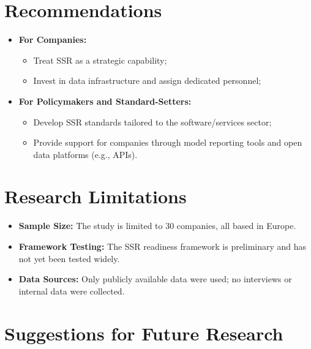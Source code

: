 \section{Recommendations}

\begin{itemize}
    \item \textbf{For Companies:}
    \begin{itemize}
        \item Treat SSR as a strategic capability;
        \item Invest in data infrastructure and assign dedicated personnel;
    \end{itemize}

    \item \textbf{For Policymakers and Standard-Setters:}
    \begin{itemize}
        \item Develop SSR standards tailored to the software/services sector;
        \item Provide support for companies through model reporting tools and open data platforms (e.g., APIs).
    \end{itemize}
\end{itemize}

\section{Research Limitations}

\begin{itemize}
    \item \textbf{Sample Size:}  
    The study is limited to 30 companies, all based in Europe.

    \item \textbf{Framework Testing:}  
    The SSR readiness framework is preliminary and has not yet been tested widely.

    \item \textbf{Data Sources:}  
    Only publicly available data were used; no interviews or internal data were collected.
\end{itemize}

\section{Suggestions for Future Research}

